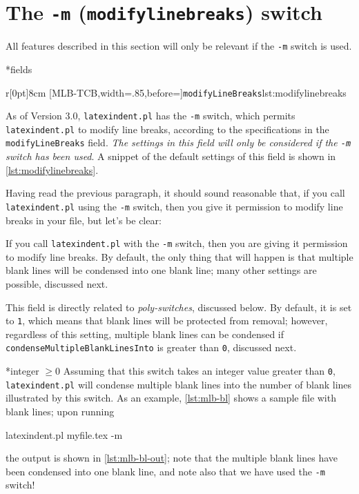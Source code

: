 \section{The \texttt{-m} (\texttt{modifylinebreaks}) switch}
 \label{sec:modifylinebreaks}
 All features described in this section will only be relevant if the \texttt{-m} switch is used.

*{fields}
	\begin{wrapfigure}[7]{r}[0pt]{8cm}
		[MLB-TCB,width=.85\linewidth,before=\centering]{\texttt{modifyLineBreaks}}{lst:modifylinebreaks}
	\end{wrapfigure}
	As of Version 3.0, \texttt{latexindent.pl} has the \texttt{-m} switch, which permits \texttt{latexindent.pl} to modify line breaks, according to the specifications in the \texttt{modifyLineBreaks} field.
	\emph{The settings
		in this field will only be considered if the \texttt{-m} switch has been used}.
	A snippet of the default settings of this field is shown in \cref{lst:modifylinebreaks}.

	Having read the previous paragraph, it should sound reasonable that, if you call \texttt{latexindent.pl} using the \texttt{-m} switch, then you give it permission to modify line breaks in your file, but let's be clear: 

	\begin{warning} If you call \texttt{latexindent.pl} with the \texttt{-m} switch, then you are giving it permission to modify line breaks.
		By default, the only thing that will happen is that multiple blank lines will be condensed into one blank line; many other settings are possible, discussed next.
	\end{warning}

	This field is directly related to \emph{poly-switches}, discussed below.
	By default, it is set to \texttt{1}, which means that blank lines will be protected from removal; however, regardless of this setting, multiple blank lines can be condensed if \texttt{condenseMultipleBlankLinesInto} is greater than \texttt{0}, discussed next.

*{integer $\geq 0$}
	Assuming that this switch takes an integer value greater than \texttt{0}, \texttt{latexindent.pl} will condense multiple blank lines into the number of blank lines illustrated by this switch.
	As an example, \cref{lst:mlb-bl} shows a sample file with blank lines; upon running \begin{commandshell}
latexindent.pl myfile.tex -m  
\end{commandshell} the output is shown in \cref{lst:mlb-bl-out}; note that the multiple blank lines have been condensed into one blank line, and note also that we have used the \texttt{-m} switch!

